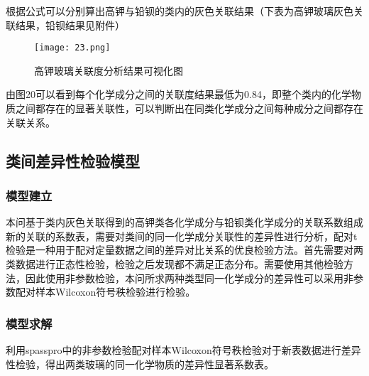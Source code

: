 根据公式可以分别算出高钾与铅钡的类内的灰色关联结果（下表为高钾玻璃灰色关联结果，铅钡结果见附件）

\begin{figure}[H] 
	\centering %
	\texttt{[image: 23.png]} %
	\caption{高钾玻璃关联度分析结果可视化图} %
	\label{Fig.main24} %
\end{figure}

由图20可以看到每个化学成分之间的关联度结果最低为0.84，即整个类内的化学物质之间都存在的显著关联性，可以判断出在同类化学成分之间每种成分之间都存在关联关系。


\subsection{类间差异性检验模型}

\subsubsection{模型建立}

本问基于类内灰色关联得到的高钾类各化学成分与铅钡类化学成分的关联系数组成新的关联的系数表，需要对类间的同一化学成分关联性的差异性进行分析，配对t检验是一种用于配对定量数据之间的差异对比关系的优良检验方法。首先需要对两类数据进行正态性检验，检验之后发现都不满足正态分布。需要使用其他检验方法，因此使用非参数检验，本问所求两种类型同一化学成分的差异性可以采用非参数配对样本Wilcoxon符号秩检验进行检验。

\subsubsection{模型求解}

利用spasspro中的非参数检验配对样本Wilcoxon符号秩检验对于新表数据进行差异性检验，得出两类玻璃的同一化学物质的差异性显著系数表。

